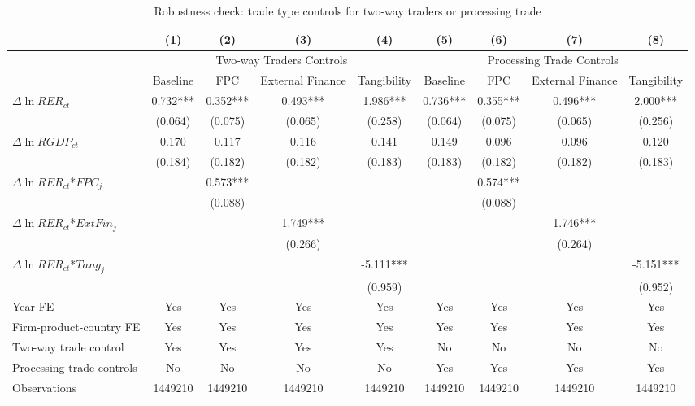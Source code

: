 \documentclass[12pt]{article}
\begin{document}
\begin{table}
	\centering
	\caption{Robustness check: trade type controls for two-way traders or processing trade}
	\begin{threeparttable}
		\begin{tabular}{lcccccccc}
			\toprule
			& (1)   & (2)   & (3)   & (4) &  (5)  &  (6)   & (7)   & (8)\\
			\midrule
			& \multicolumn{4}{c}{Two-way Traders Controls} & \multicolumn{4}{c}{Processing Trade Controls}\\
			& Baseline & FPC & External Finance & Tangibility & Baseline & FPC & External Finance & Tangibility\\
			\midrule
			$\Delta \ln RER_{ct}$ & 0.732*** & 0.352*** & 0.493*** & 1.986*** & 0.736*** & 0.355*** & 0.496*** & 2.000*** \\
			& (0.064) & (0.075) & (0.065) & (0.258) & (0.064) & (0.075) & (0.065) & (0.256) \\
			$\Delta \ln RGDP_{ct}$ & 0.170 & 0.117 & 0.116 & 0.141 & 0.149 & 0.096 & 0.096 & 0.120 \\
			& (0.184) & (0.182) & (0.182) & (0.183) & (0.183) & (0.182) & (0.182) & (0.183) \\
			$\Delta \ln RER_{ct}$*$FPC_{j}$ &   & 0.573*** &       &       &       & 0.574*** &       &  \\
			&   & (0.088) &       &       &       & (0.088) &       &  \\
			$\Delta \ln RER_{ct}$*$ExtFin_{j}$ &    &       & 1.749*** &       &       &       & 1.746*** &  \\
			&     &       & (0.266) &       &       &       & (0.264) &  \\
			$\Delta \ln RER_{ct}$*$Tang_{j}$ &     &       &       & -5.111*** &       &       &       & -5.151*** \\
			&     &       &       & (0.959) &       &       &       & (0.952) \\
			Year FE  &  Yes   & Yes   & Yes   & Yes &  Yes   & Yes   & Yes   & Yes\\
			Firm-product-country FE &  Yes   & Yes   & Yes   & Yes &  Yes   & Yes   & Yes   & Yes\\
			Two-way trade control &  Yes   & Yes   & Yes   & Yes & No & No & No & No\\
			Processing trade controls & No & No & No & No &  Yes   & Yes   & Yes  & Yes \\
			Observations & 1449210 & 1449210 & 1449210 & 1449210 & 1449210 & 1449210 & 1449210 & 1449210\\

\end{tabular}
\end{threeparttable}
\end{table}
\end{document}
